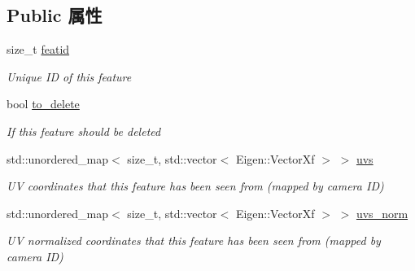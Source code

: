 \subsection*{Public 属性}
\begin{DoxyCompactItemize}
\item 
\mbox{\label{classov__core_1_1Feature_a2d29cbda05723b3c681fca9d9c08a6b6}} 
size\+\_\+t \hyperlink{classov__core_1_1Feature_a2d29cbda05723b3c681fca9d9c08a6b6}{featid}
\begin{DoxyCompactList}\small\item\em Unique ID of this feature \end{DoxyCompactList}\item 
\mbox{\label{classov__core_1_1Feature_afd7ba032d3f576d6cedff37326a00766}} 
bool \hyperlink{classov__core_1_1Feature_afd7ba032d3f576d6cedff37326a00766}{to\+\_\+delete}
\begin{DoxyCompactList}\small\item\em If this feature should be deleted \end{DoxyCompactList}\item 
\mbox{\label{classov__core_1_1Feature_a0158e28d76464ab4daa4ac498270b6a0}} 
std\+::unordered\+\_\+map$<$ size\+\_\+t, std\+::vector$<$ Eigen\+::\+Vector\+Xf $>$ $>$ \hyperlink{classov__core_1_1Feature_a0158e28d76464ab4daa4ac498270b6a0}{uvs}
\begin{DoxyCompactList}\small\item\em UV coordinates that this feature has been seen from (mapped by camera ID) \end{DoxyCompactList}\item 
\mbox{\label{classov__core_1_1Feature_a9eb23faca74853073bf7625c9cdfe93f}} 
std\+::unordered\+\_\+map$<$ size\+\_\+t, std\+::vector$<$ Eigen\+::\+Vector\+Xf $>$ $>$ \hyperlink{classov__core_1_1Feature_a9eb23faca74853073bf7625c9cdfe93f}{uvs\+\_\+norm}
\begin{DoxyCompactList}\small\item\em UV normalized coordinates that this feature has been seen from (mapped by camera ID) \end{DoxyCompactList}\item 
\mbox{\label{classov__core_1_1Feature_a16de72ae07065bc81570d63ec694d743}} 

\end{DoxyCompactItemize}
